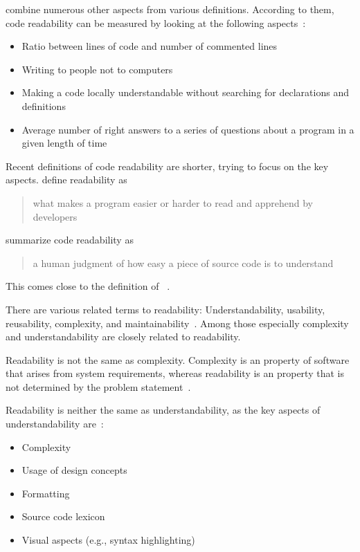 \documentclass[%
class=scrreprt,
chapterprefix=false,%
open=right,%
twoside=true,%
paper=a4,%
logofile={Logo\_zentral\_farbig\_EN.png},%
thesistype=master,%
UKenglish,%
]{se2thesis}
\theoremstyle{definition}
\begin{document}
	\citeauthor{tashtoush2013impact} combine numerous other aspects from various definitions. According to them, code readability can be measured by looking at the following aspects~\cite{tashtoush2013impact}:
	\begin{itemize}
		\item Ratio between lines of code and number of commented lines
		\item Writing to people not to computers
		\item Making a code locally understandable without searching for declarations and definitions
		\item Average number of right answers to a series of questions about a program in a given length of time
	\end{itemize}
	
	Recent definitions of code readability are shorter, trying to focus on the key aspects. \citeauthor{oliveira2020evaluating} define readability as
	\blockcquote{oliveira2020evaluating}{what makes a program easier or harder to read and apprehend by developers}.
			
	\citeauthor{mi2021effectiveness} summarize code readability as \blockcquote{mi2021effectiveness}{a human judgment of how easy a piece of source code is to understand}. This comes close to the definition of \citeauthor{buse2009learning}~\cite{buse2009learning}.
	
	There are various related terms to readability: Understandability, usability, reusability, complexity, and maintainability~\cite{tashtoush2013impact}. Among those especially complexity and understandability are closely related to readability.
	
	Readability is not the same as complexity. Complexity is an  property of software that arises
	from system requirements, whereas readability is an  property that is not determined by the problem statement~\cite{buse2009learning, brooks1987no}.
	
	Readability is neither the same as understandability, as the key aspects of understandability are~\cite{scalabrino2018comprehensive, martin2009clean, wilson2007beautiful, beck2007implementation}:
	\begin{itemize}
		\item Complexity
		\item Usage of design concepts
		\item Formatting
		\item Source code lexicon
		\item Visual aspects (e.g., syntax highlighting)
	\end{itemize}
	
\end{document}
